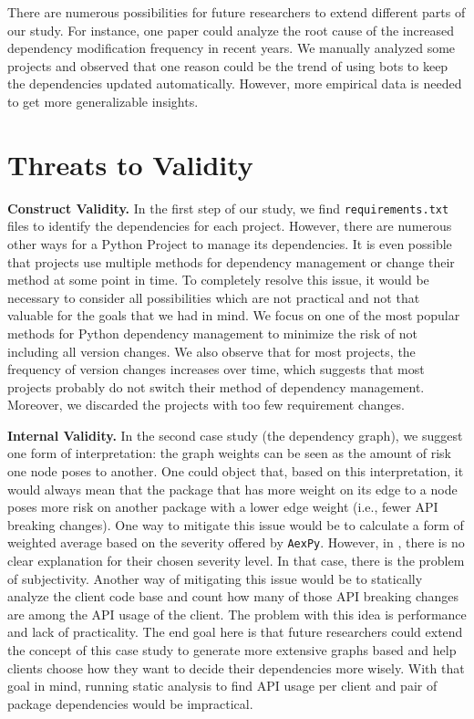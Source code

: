 \documentclass[conference]{IEEEtran}
\begin{document}
There are numerous possibilities for future researchers to extend different parts of our study. For instance, one paper could analyze the root cause of the increased dependency modification frequency in recent years. We manually analyzed some projects and observed that one reason could be the trend of using bots to keep the dependencies updated automatically. However, more empirical data is needed to get more generalizable insights.


\section{Threats to Validity}
\textbf{Construct Validity.}
In the first step of our study, we find \texttt{requirements.txt} files to identify the dependencies for each project. However, there are numerous other ways for a Python Project to manage its dependencies. It is even possible that projects use multiple methods for dependency management or change their method at some point in time. To completely resolve this issue, it would be necessary to consider all possibilities which are not practical and not that valuable for the goals that we had in mind. We focus on one of the most popular methods for Python dependency management to minimize the risk of not including all version changes. We also observe that for most projects, the frequency of version changes increases over time, which suggests that most projects probably do not switch their method of dependency management. Moreover, we discarded the projects with too few requirement changes.

\textbf{Internal Validity.}
In the second case study (the dependency graph), we suggest one form of interpretation: the graph weights can be seen as the amount of risk one node poses to another. One could object that, based on this interpretation, it would always mean that the package that has more weight on its edge to a node poses more risk on another package with a lower edge weight (i.e., fewer API breaking changes). One way to mitigate this issue would be to calculate a form of weighted average based on the severity offered by \texttt{AexPy}. However, in \cite{aexpy}, there is no clear explanation for their chosen severity level. In that case, there is the problem of subjectivity. Another way of mitigating this issue would be to statically analyze the client code base and count how many of those API breaking changes are among the API usage of the client. The problem with this idea is performance and lack of practicality. The end goal here is that future researchers could extend the concept of this case study to generate more extensive graphs based and help clients choose how they want to decide their dependencies more wisely. With that goal in mind, running static analysis to find API usage per client and pair of package dependencies would be impractical.  
\end{document}
